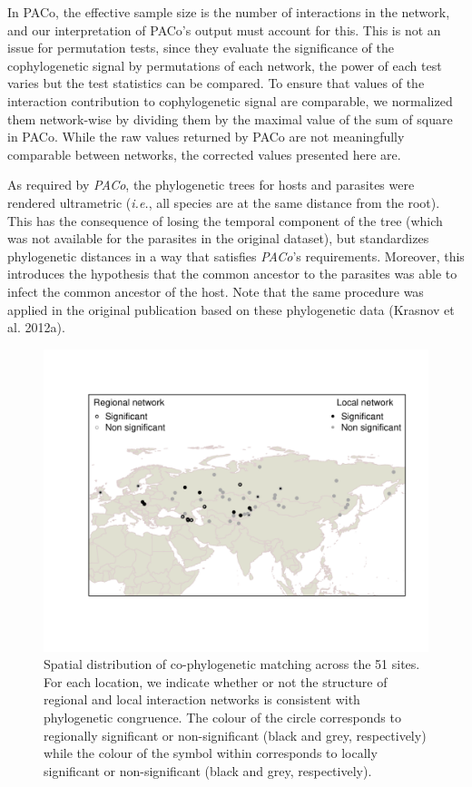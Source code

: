 \documentclass[12pt]{article}
\begin{document}
In PACo, the effective sample size is the number of interactions in the
network, and our interpretation of PACo's output must account for this.
This is not an issue for permutation tests, since they evaluate the
significance of the cophylogenetic signal by permutations of each
network, the power of each test varies but the test statistics can be
compared. To ensure that values of the interaction contribution to
cophylogenetic signal are comparable, we normalized them network-wise by
dividing them by the maximal value of the sum of square in PACo. While
the raw values returned by PACo are not meaningfully comparable between
networks, the corrected values presented here are.

As required by \emph{PACo}, the phylogenetic trees for hosts and
parasites were rendered ultrametric (\emph{i.e.}, all species are at the
same distance from the root). This has the consequence of losing the
temporal component of the tree (which was not available for the
parasites in the original dataset), but standardizes phylogenetic
distances in a way that satisfies \emph{PACo}'s requirements. Moreover,
this introduces the hypothesis that the common ancestor to the parasites
was able to infect the common ancestor of the host. Note that the same
procedure was applied in the original publication based on these
phylogenetic data (Krasnov et al. 2012a).

\begin{figure}[htbp]
\centering
\includegraphics[width=1.00000\textwidth]{figures/figure1.pdf}
\caption{Spatial distribution of co-phylogenetic matching across the 51
sites. For each location, we indicate whether or not the structure of
regional and local interaction networks is consistent with phylogenetic
congruence. The colour of the circle corresponds to regionally
significant or non-significant (black and grey, respectively) while the
colour of the symbol within corresponds to locally significant or
non-significant (black and grey, respectively).\label{fig:maps}}
\end{figure}
\end{document}
